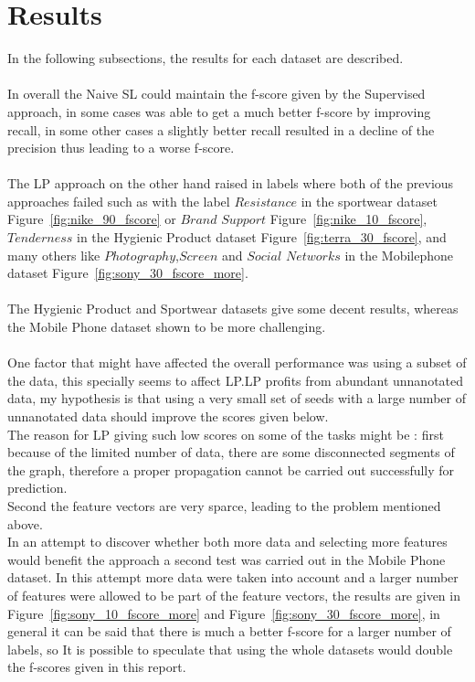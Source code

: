 \documentclass[4pt,a4paper,twocolumn]{article}
\begin{document}
\section{Results}
In the following subsections, the results for each dataset are described.\\
\\
In overall the Naive SL could maintain the f-score given by the Supervised approach, in some cases was able to get a much better f-score by improving recall, in some other cases a slightly better recall resulted in a decline of the precision thus leading to a worse f-score.\\
\\
The LP approach on the other hand raised in labels where both of the previous approaches failed such as with the label $Resistance$  in the sportwear dataset Figure~\ref{fig:nike_90_fscore} or $Brand$ $Support$ Figure~\ref{fig:nike_10_fscore},  $Tenderness$  in the Hygienic Product dataset Figure~\ref{fig:terra_30_fscore}, and many others like $Photography$,$Screen$ and $Social$ $Networks$ in the Mobilephone dataset Figure~\ref{fig:sony_30_fscore_more}.\\
\\
The Hygienic Product and Sportwear datasets give some decent results, whereas the Mobile Phone dataset shown to be more challenging.\\
\\
One factor that might have affected the overall performance was using a subset of the data, this specially seems to affect LP.LP profits from abundant unnanotated data, my hypothesis is that using a very small set of seeds with a large number of unnanotated data should improve the scores given below.\\
The reason for LP giving such low scores  on some of the tasks might be : first because of the limited number of data, there are some disconnected segments of the graph, therefore a proper propagation cannot be carried out successfully for prediction.\\
Second the feature vectors are very sparce, leading to the problem mentioned above.\\
In an attempt to discover whether both more data and selecting more features would benefit the approach  a second test was carried out in the Mobile Phone dataset. In this attempt more data were taken into account and a larger number of features were allowed to be part of the feature vectors, the results are given in Figure~\ref{fig:sony_10_fscore_more} and Figure~\ref{fig:sony_30_fscore_more}, in general it can be said that there is much a better f-score for a larger number of labels, so It is possible to speculate that using the whole datasets would double the f-scores given in this report.\\
\\
\end{document}
